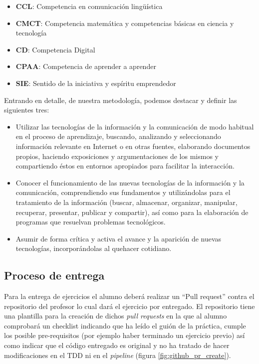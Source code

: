 \begin{itemize}
    \item \textbf{CCL}: Competencia en comunicación lingüística
    \item \textbf{CMCT}: Competencia matemática y competencias básicas en ciencia y tecnología
    \item \textbf{CD}: Competencia Digital
    \item \textbf{CPAA}: Competencia de aprender a aprender
    \item \textbf{SIE}: Sentido de la iniciativa y espíritu emprendedor
\end{itemize}

Entrando en detalle, de nuestra metodología, podemos destacar y definir las siguientes tres:

\begin{itemize}

    \item Utilizar las tecnologías de la información y la comunicación de modo habitual en el proceso de aprendizaje, buscando, analizando y seleccionando información relevante en Internet o en otras fuentes,  elaborando documentos propios, haciendo exposiciones y argumentaciones de los mismos y compartiendo éstos en entornos apropiados para facilitar la interacción.

    \item Conocer el funcionamiento de las nuevas tecnologías de la información y la comunicación, comprendiendo sus fundamentos y utilizándolas para el tratamiento de la información (buscar, almacenar, organizar, manipular, recuperar, presentar, publicar y compartir), así como para la elaboración de programas que resuelvan problemas tecnológicos.

    \item Asumir de forma crítica y activa el avance y la aparición de nuevas tecnologías, incorporándolas al quehacer cotidiano.

\end{itemize}

\subsection{Proceso de entrega}
Para la entrega de ejercicios el alumno deberá realizar un ``Pull request'' contra el repositorio del profesor lo cual dará el ejercicio por entregado. El repositorio tiene una plantilla para la creación de dichos \textit{pull requests} en la que al alumno comprobará un checklist indicando que ha leído el guión de la práctica, cumple los posible pre-requisitos (por ejemplo haber terminado un ejercicio previo) así como indicar que el código entregado es original y no ha tratado de hacer modificaciones en el TDD ni en el \textit{pipeline} (figura \ref{fig:github_pr_create}).

